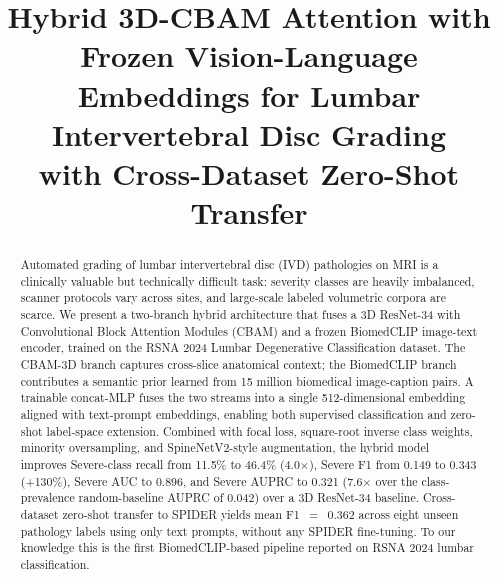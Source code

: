 \documentclass[conference]{IEEEtran}
\begin{document}
\title{Hybrid 3D-CBAM Attention with Frozen Vision-Language\\
       Embeddings for Lumbar Intervertebral Disc Grading\\
       with Cross-Dataset Zero-Shot Transfer}

\author{
        }

\maketitle

\begin{abstract}
Automated grading of lumbar intervertebral disc (IVD) pathologies on MRI is
a clinically valuable but technically difficult task: severity classes are
heavily imbalanced, scanner protocols vary across sites, and large-scale
labeled volumetric corpora are scarce. We present a two-branch hybrid
architecture that fuses a 3D ResNet-34 with Convolutional Block Attention
Modules (CBAM) and a frozen BiomedCLIP image-text encoder, trained on
the RSNA 2024 Lumbar Degenerative Classification dataset. The CBAM-3D
branch captures cross-slice anatomical context; the BiomedCLIP branch
contributes a semantic prior learned from 15 million biomedical
image-caption pairs. A trainable concat-MLP fuses the two streams into a
single 512-dimensional embedding aligned with text-prompt embeddings,
enabling both supervised classification and zero-shot label-space
extension. Combined with focal loss, square-root inverse class weights,
minority oversampling, and SpineNetV2-style augmentation, the hybrid
model improves Severe-class recall from 11.5\% to 46.4\% (4.0$\times$),
Severe F1 from 0.149 to 0.343 (+130\%), Severe AUC to 0.896, and Severe
AUPRC to 0.321 (7.6$\times$ over the class-prevalence random-baseline
AUPRC of 0.042) over a 3D ResNet-34 baseline. Cross-dataset zero-shot transfer to SPIDER yields
mean F1~$=$~0.362 across eight unseen pathology labels using only text
prompts, without any SPIDER fine-tuning. To our knowledge this is the
first BiomedCLIP-based pipeline reported on RSNA 2024 lumbar
classification.
\end{abstract}
\end{document}
